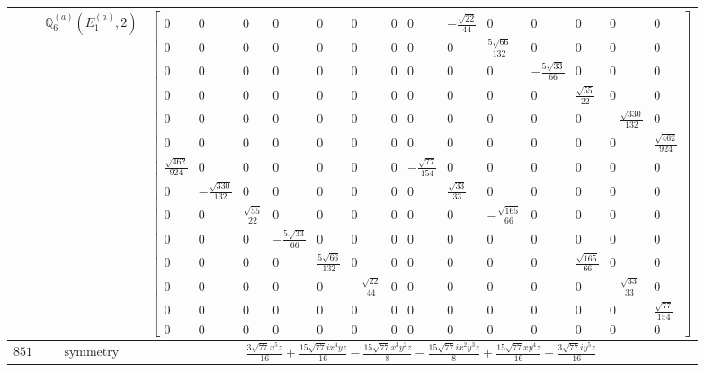 \documentclass[fleqn,8pt,landscape]{jsarticle}
\begin{document}
\begin{longtable}{ccc}
$  $ & $ \mathbb{Q}_{6}^{(a)}(E_{1}^{(a)},2) $ & $ \begin{bmatrix} 0 & 0 & 0 & 0 & 0 & 0 & 0 & 0 & - \frac{\sqrt{22}}{44} & 0 & 0 & 0 & 0 & 0 \\ 0 & 0 & 0 & 0 & 0 & 0 & 0 & 0 & 0 & \frac{5 \sqrt{66}}{132} & 0 & 0 & 0 & 0 \\ 0 & 0 & 0 & 0 & 0 & 0 & 0 & 0 & 0 & 0 & - \frac{5 \sqrt{33}}{66} & 0 & 0 & 0 \\ 0 & 0 & 0 & 0 & 0 & 0 & 0 & 0 & 0 & 0 & 0 & \frac{\sqrt{55}}{22} & 0 & 0 \\ 0 & 0 & 0 & 0 & 0 & 0 & 0 & 0 & 0 & 0 & 0 & 0 & - \frac{\sqrt{330}}{132} & 0 \\ 0 & 0 & 0 & 0 & 0 & 0 & 0 & 0 & 0 & 0 & 0 & 0 & 0 & \frac{\sqrt{462}}{924} \\ \frac{\sqrt{462}}{924} & 0 & 0 & 0 & 0 & 0 & 0 & - \frac{\sqrt{77}}{154} & 0 & 0 & 0 & 0 & 0 & 0 \\ 0 & - \frac{\sqrt{330}}{132} & 0 & 0 & 0 & 0 & 0 & 0 & \frac{\sqrt{33}}{33} & 0 & 0 & 0 & 0 & 0 \\ 0 & 0 & \frac{\sqrt{55}}{22} & 0 & 0 & 0 & 0 & 0 & 0 & - \frac{\sqrt{165}}{66} & 0 & 0 & 0 & 0 \\ 0 & 0 & 0 & - \frac{5 \sqrt{33}}{66} & 0 & 0 & 0 & 0 & 0 & 0 & 0 & 0 & 0 & 0 \\ 0 & 0 & 0 & 0 & \frac{5 \sqrt{66}}{132} & 0 & 0 & 0 & 0 & 0 & 0 & \frac{\sqrt{165}}{66} & 0 & 0 \\ 0 & 0 & 0 & 0 & 0 & - \frac{\sqrt{22}}{44} & 0 & 0 & 0 & 0 & 0 & 0 & - \frac{\sqrt{33}}{33} & 0 \\ 0 & 0 & 0 & 0 & 0 & 0 & 0 & 0 & 0 & 0 & 0 & 0 & 0 & \frac{\sqrt{77}}{154} \\ 0 & 0 & 0 & 0 & 0 & 0 & 0 & 0 & 0 & 0 & 0 & 0 & 0 & 0 \end{bmatrix} $ \\ \hline
$ 851 $ & $ \text{symmetry} $ & $ \frac{3 \sqrt{77} x^{5} z}{16} + \frac{15 \sqrt{77} i x^{4} y z}{16} - \frac{15 \sqrt{77} x^{3} y^{2} z}{8} - \frac{15 \sqrt{77} i x^{2} y^{3} z}{8} + \frac{15 \sqrt{77} x y^{4} z}{16} + \frac{3 \sqrt{77} i y^{5} z}{16} $ \\

\end{longtable}
\end{document}
